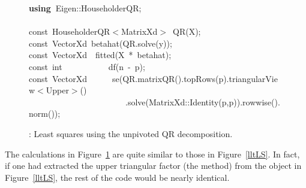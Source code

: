 \documentclass[shortnames,article]{jss}
\newcommand{\hlstd}[1]{\textcolor[rgb]{0,0,0}{#1}}
\newcommand{\hlopt}[1]{\textcolor[rgb]{0,0,0}{#1}}
\newcommand{\hlkwa}[1]{\textcolor[rgb]{0.61,0.13,0.93}{\bf{#1}}}
\newcommand{\hlkwb}[1]{\textcolor[rgb]{0.13,0.54,0.13}{#1}}
\newcommand{\hlkwd}[1]{\textcolor[rgb]{0,0,0}{#1}}
\begin{document}
\begin{figure}[htb]
    \noindent
    \ttfamily
    \hlstd{}\hlkwa{using\ }\hlstd{Eigen}\hlopt{::}\hlstd{HouseholderQR}\hlopt{;}\hspace*{\fill}\\
    \hlstd{}\hspace*{\fill}\\
    \hlkwb{const\ }\hlstd{HouseholderQR}\hlopt{$<$}\hlstd{MatrixXd}\hlopt{$>$\ }\hlstd{}\hlkwd{QR}\hlstd{}\hlopt{(}\hlstd{X}\hlopt{);}\hspace*{\fill}\\
    \hlstd{}\hlkwb{const\ }\hlstd{VectorXd\ }\hlkwd{betahat}\hlstd{}\hlopt{(}\hlstd{QR}\hlopt{.}\hlstd{}\hlkwd{solve}\hlstd{}\hlopt{(}\hlstd{y}\hlopt{));}\hspace*{\fill}\\
    \hlstd{}\hlkwb{const\ }\hlstd{VectorXd}\hlstd{\ \ }\hlstd{}\hlkwd{fitted}\hlstd{}\hlopt{(}\hlstd{X\ }\hlopt{{*}\ }\hlstd{betahat}\hlopt{);}\hspace*{\fill}\\
    \hlstd{}\hlkwb{const\ int}\hlstd{\ \ \ \ \ \ \ \ \ \ \ }\hlkwb{}\hlstd{}\hlkwd{df}\hlstd{}\hlopt{(}\hlstd{n\ }\hlopt{{-}\ }\hlstd{p}\hlopt{);}\hspace*{\fill}\\
    \hlstd{}\hlkwb{const\ }\hlstd{VectorXd}\hlstd{\ \ \ \ \ \ }\hlstd{}\hlkwd{se}\hlstd{}\hlopt{(}\hlstd{QR}\hlopt{.}\hlstd{}\hlkwd{matrixQR}\hlstd{}\hlopt{().}\hlstd{}\hlkwd{topRows}\hlstd{}\hlopt{(}\hlstd{p}\hlopt{).}\hlstd{triangularView}\hlopt{$<$}\hlstd{Upper}\hlopt{$>$()}\hspace*{\fill}\\
    \hlstd{}\hlstd{\ \ \ \ \ \ \ \ \ \ \ \ \ \ \ \ \ \ \ \ \ \ \ }\hlstd{}\hlopt{.}\hlstd{}\hlkwd{solve}\hlstd{}\hlopt{(}\hlstd{MatrixXd}\hlopt{::}\hlstd{}\hlkwd{Identity}\hlstd{}\hlopt{(}\hlstd{p}\hlopt{,}\hlstd{p}\hlopt{)).}\hlstd{}\hlkwd{rowwise}\hlstd{}\hlopt{().}\hlstd{}\hlkwd{norm}\hlstd{}\hlopt{());}\hlstd{}\hspace*{\fill}\\
    \mbox{}
    \normalfont
    \normalsize
    \caption{: Least squares using the unpivoted QR decomposition.}
    \label{QRLS}
\end{figure}
The calculations in Figure~\ref{QRLS} are quite similar to those in
Figure~\ref{lltLS}.  In fact, if one had extracted the upper
triangular factor (the  method) from the 
object in Figure~\ref{lltLS}, the rest of the code would be nearly
identical.
\end{document}
